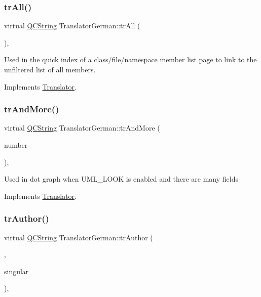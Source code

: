 \subsubsection{\texorpdfstring{trAll()}{trAll()}}
{\footnotesize\ttfamily virtual \mbox{\hyperlink{class_q_c_string}{Q\+C\+String}} Translator\+German\+::tr\+All (\begin{DoxyParamCaption}{ }\end{DoxyParamCaption})\hspace{0.3cm}{\ttfamily [inline]}, {\ttfamily [virtual]}}

Used in the quick index of a class/file/namespace member list page to link to the unfiltered list of all members. 

Implements \mbox{\hyperlink{class_translator}{Translator}}.

\mbox{\label{class_translator_german_a33603e7bd7ea2c17613d4ea92bf2a61b}} 
\subsubsection{\texorpdfstring{trAndMore()}{trAndMore()}}
{\footnotesize\ttfamily virtual \mbox{\hyperlink{class_q_c_string}{Q\+C\+String}} Translator\+German\+::tr\+And\+More (\begin{DoxyParamCaption}\item[{const \mbox{\hyperlink{class_q_c_string}{Q\+C\+String}} \&}]{number }\end{DoxyParamCaption})\hspace{0.3cm}{\ttfamily [inline]}, {\ttfamily [virtual]}}

Used in dot graph when U\+M\+L\+\_\+\+L\+O\+OK is enabled and there are many fields 

Implements \mbox{\hyperlink{class_translator}{Translator}}.

\mbox{\label{class_translator_german_a32cc23772522eef38aeb62dc83fc917d}} 
\subsubsection{\texorpdfstring{trAuthor()}{trAuthor()}}
{\footnotesize\ttfamily virtual \mbox{\hyperlink{class_q_c_string}{Q\+C\+String}} Translator\+German\+::tr\+Author (\begin{DoxyParamCaption}\item[{bool}]{,  }\item[{bool}]{singular }\end{DoxyParamCaption})\hspace{0.3cm}{\ttfamily [inline]}, {\ttfamily [virtual]}}

